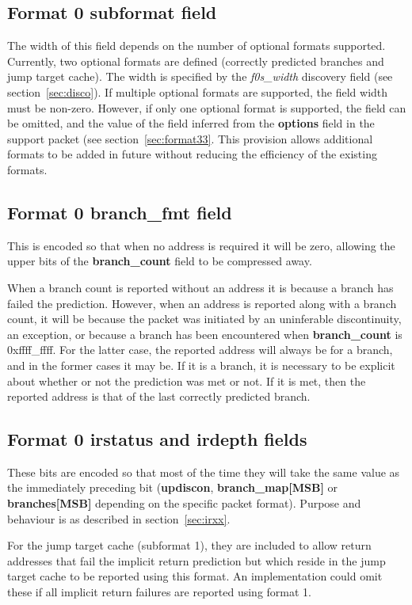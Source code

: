\subsection{Format 0 subformat field} \label{sec:f0s}

The width of this field depends on the number of optional formats supported.  Currently, two optional formats are
defined (correctly predicted branches and jump target cache).  The width is specified by the 
\textit{f0s\_width} discovery field (see section~\ref{sec:disco}).  If multiple optional formats are supported, the field
width must be non-zero.  However, if only one optional format is supported, the field can be 
omitted, and the value of the field inferred from the \textbf{options} field in the support packet (see section~\ref{sec:format33}.  
This provision allows additional formats to be added in future without reducing the efficiency of the existing formats.

\subsection{Format 0 \textbf{branch\_fmt} field}

This is encoded so that when no address is required it will be zero, allowing the upper bits of the \textbf{branch\_count} 
field to be compressed away.

When a branch count is reported without an address it is because a branch has failed the prediction.  However, when an address is 
reported along with a branch count, it will be because the packet was initiated by an uninferable discontinuity, an exception, or 
because a branch has been encountered when \textbf{branch\_count} is 0xffff\_ffff.  For the latter case, the 
reported address will always be for a branch, and in the former cases it may be.  If it is a branch, 
it is necessary to be explicit about whether or not the prediction was met or not.  If it is met, then the reported address is 
that of the last correctly predicted branch.

\subsection{Format 0 \textbf{irstatus} and \textbf{irdepth} fields}
These bits are encoded so that most of the time they will take the same value as the immediately preceding bit
(\textbf{updiscon}, \textbf{branch\_map[MSB]} or \textbf{branches[MSB]} depending on the specific packet format).  
Purpose and behaviour is as described in section~\ref{sec:irxx}.

For the jump target cache (subformat 1), they are included to allow return addresses that fail the implicit return 
prediction but which reside in the jump target cache to be reported using this format.  An implementation
could omit these if all implicit return failures are reported using format 1.





